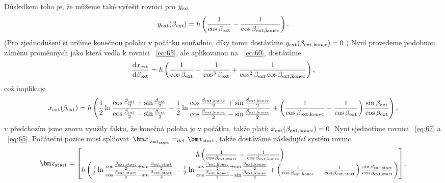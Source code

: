 \documentclass[reqno, a4paper]{amsart}
\begin{document}
Důsledkem toho je, že můžeme také vyřešit rovnici pro $y_{\mathrm{ext}}$
\begin{equation}
  \label{eq:65}
  y_{\mathrm{ext}}(\beta_{\mathrm{ext}})
  =
  h
  \left(
    \frac{1}{\cos \beta_{\mathrm{ext}}}
    -
    \frac{1}{\cos \beta_{\mathrm{ext}, \mathrm{konec}}}
  \right)
  .
\end{equation}
(Pro zjednodušení si určíme konečnou polohu v počátku souřadnic, díky tomu dostáváme $y_{\mathrm{ext}}(\beta_{\mathrm{ext}, \mathrm{konec}}) = 0$.)
Nyní provedeme podobnou záměnu proměnných jako která vedla k rovnici ~\eqref{eq:65}, ale aplikovanou na ~\eqref{eq:60}, dostáváme
\begin{equation}
  \label{eq:66}
  \frac{\mathrm{d} {x_{\mathrm{ext}}}}{\mathrm{d} {\beta_{\mathrm{ext}}}}
  =
  h
  \left(
    \frac{1}{\cos \beta_{\mathrm{ext}}}
    -
    \frac{1}{\cos^3 \beta_{\mathrm{ext}}}
    +
    \frac{1}{\cos^2 \beta_{\mathrm{ext}} \cos \beta_{\mathrm{ext}, \mathrm{konec}}}
  \right)
  ,
\end{equation}
což implikuje
\begin{equation}
  \label{eq:67}
  x_{\mathrm{ext}}(\beta_{\mathrm{ext}})
  =
  h
  \left(
    \frac{1}{2}
    \ln
    \frac{\cos \frac{\beta_{\mathrm{ext}}}{2} + \sin \frac{\beta_{\mathrm{ext}}}{2}}{\cos \frac{\beta_{\mathrm{ext}}}{2} - \sin \frac{\beta_{\mathrm{ext}}}{2}}
    -
    \frac{1}{2}
    \ln
    \frac{\cos \frac{\beta_{\mathrm{ext}, \mathrm{konec}}}{2} + \sin \frac{\beta_{\mathrm{ext}, \mathrm{konec}}}{2}}{\cos \frac{\beta_{\mathrm{ext}, \mathrm{konec}}}{2} - \sin \frac{\beta_{\mathrm{ext}, \mathrm{konec}}}{2}}
    +
    \left(
      \frac{1}{\cos \beta_{\mathrm{ext}, \mathrm{konec}}}
      -
      \frac{1}{\cos \beta_{\mathrm{ext}}}
    \right)
    \frac{\sin \beta_{\mathrm{ext}}}{\cos \beta_{\mathrm{ext}}}
  \right)
  ,
\end{equation}
v předchozím jsme znovu využily faktu, že konečná poloha je v počátku, takže platí: $x_{\mathrm{ext}}(\beta_{\mathrm{ext}, \mathrm{konec}}) = 0$. Nyní sjednotíme rovnici ~\eqref{eq:67} a ~\eqref{eq:65}. Počáteční pozice musí splňovat $ \left. \vec{x} \right|_{t=t_\navstart} = _{\bydefinition} \vec{x}_{\navstart}$, takže dostáváme následující systém rovnic
\begin{equation}
  \label{eq:68}
  \vec{x}_{\navstart}
  =
  \begin{bmatrix}
    h
  \left(
    \frac{1}{\cos \beta_{\navext, \navstart}}
    -
    \frac{1}{\cos \beta_{\navext, \navend}}
  \right)
  \\
  h
  \left(
    \frac{1}{2}
    \ln
    \frac{\cos \frac{\beta_{\navext, \navstart}}{2} + \sin \frac{\beta_{\navext, \navstart}}{2}}{\cos \frac{\beta_{\navext, \navstart}}{2} - \sin \frac{\beta_{\navext, \navstart}}{2}}
    -
    \frac{1}{2}
    \ln
    \frac{\cos \frac{\beta_{\navext, \navend}}{2} + \sin \frac{\beta_{\navext, \navend}}{2}}{\cos \frac{\beta_{\navext, \navend}}{2} - \sin \frac{\beta_{\navext, \navend}}{2}}
    +
    \left(
      \frac{1}{\cos \beta_{\navext, \navend}}
      -
      \frac{1}{\cos \beta_{\navext, \navstart}}
    \right)
    \frac{\sin \beta_{\navext, \navstart}}{\cos \beta_{\navext, \navstart}}
  \right)
\end{bmatrix}
.
\end{equation}
\end{document}
